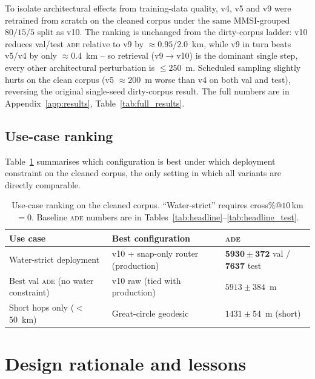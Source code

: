 \documentclass[oneside, a4paper, onecolumn, 11pt]{article}
\newcommand{\ade}{\textsc{ade}}
\begin{document}
To isolate architectural effects from training-data quality, v4, v5
and v9 were retrained from scratch on the cleaned corpus under the
same MMSI-grouped $80/15/5$ split as v10.  The ranking is unchanged
from the dirty-corpus ladder: v10 reduces val/test \ade{} relative
to v9 by $\approx 0.95$/$2.0$~km, while v9 in turn beats v5/v4 by
only $\approx 0.4$~km -- so retrieval (v9$\to$v10) is the dominant
single step, every other architectural perturbation is $\leq 250$~m.
Scheduled sampling slightly hurts on the clean corpus (v5 $\approx
200$~m worse than v4 on both val and test), reversing the original
single-seed dirty-corpus result.  The full numbers are in
Appendix~\ref{app:results}, Table~\ref{tab:full_results}.

\subsection{Use-case ranking}

Table~\ref{tab:usecase} summarises which configuration is best under
which deployment constraint on the cleaned corpus, the only setting
in which all variants are directly comparable.

\begin{table}[ht]
\centering
\caption{Use-case ranking on the cleaned corpus.  ``Water-strict''
requires cross\%$@10$\,km $=0$.  Baseline \ade{} numbers are in
Tables~\ref{tab:headline}--\ref{tab:headline_test}.}
\label{tab:usecase}
\begin{tabular}{p{5.0cm} p{5.6cm} p{3.6cm}}
\toprule
\textbf{Use case} & \textbf{Best configuration} & \textbf{\ade} \\
\midrule
Water-strict deployment
  & v10 + snap-only router (production)
  & $\mathbf{5930\pm372}$ val / $\mathbf{7637}$ test \\
Best val \ade{} (no water constraint)
  & v10 raw (tied with production)
  & $5913 \pm 384$~m \\
Short hops only ($<$50~km)
  & Great-circle geodesic
  & $1431 \pm 54$~m (short) \\
\bottomrule
\end{tabular}
\end{table}

\section{Design rationale and lessons}\label{sec:lessons}
\end{document}
